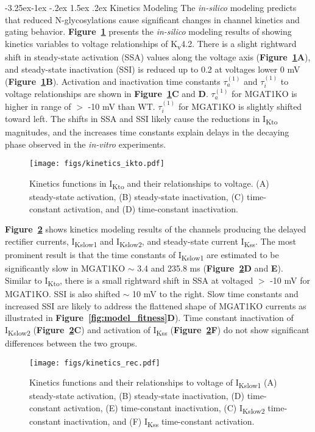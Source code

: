 \documentclass[11pt]{article}
\makeatletter
\renewcommand\subsection{\@startsection{subsection}{2}{\z@}%
                                     {-3.25ex\@plus -1ex \@minus -.2ex}%
                                     {1.5ex \@plus .2ex}%
                                     {\normalfont\fontfamily{phv}\fontsize{14}{17}\bfseries}}
\makeatother
\begin{document}
\subsection{Kinetics Modeling} \label{s:results.kinetics}
The \textit{in-silico} modeling predicts that reduced N-glycosylations cause significant changes in channel kinetics and gating behavior. \textbf{Figure~\ref{fig:kinetics_ikto}} presents the \textit{in-silico} modeling results of showing kinetics variables to voltage relationships of K\textsubscript{v}4.2. There is a slight rightward shift in steady-state activation (SSA) values along the voltage axis (\textbf{Figure~\ref{fig:kinetics_ikto}A}), and steady-state inactivation (SSI) is reduced up to 0.2 at voltages lower 0 mV (\textbf{Figure~\ref{fig:kinetics_ikto}B}). Activation and inactivation time constants $\tau_{a}^{(1)}$ and $\tau_{i}^{(1)}$ to voltage relationships are shown in \textbf{Figure~\ref{fig:kinetics_ikto}C} and \textbf{D}. $\tau_{a}^{(1)}$ for MGAT1KO is higher in range of $>$ -10 mV than WT. $\tau_{i}^{(1)}$ for MGAT1KO is slightly shifted toward left. The shifts in SSA and SSI likely cause the reductions in I\textsubscript{Kto} magnitudes, and the increases time constants explain delays in the decaying phase observed in the \textit{in-vitro} experiments.
\begin{figure}[!ht]
    \centering
    \texttt{[image: figs/kinetics\_ikto.pdf]}
    \caption{Kinetics functions in I\textsubscript{Kto} and their relationships to voltage. (A) steady-state activation, (B) steady-state inactivation, (C) time-constant activation, and (D) time-constant inactivation.}
    \label{fig:kinetics_ikto}
\end{figure}

\textbf{Figure~\ref{fig:kinetics_rec}} shows kinetics modeling results of the channels producing the delayed rectifier currents, I\textsubscript{Kslow1} and I\textsubscript{Kslow2}, and steady-state current I\textsubscript{Kss}. The most prominent result is that the time constants of I\textsubscript{Kslow1} are estimated to be significantly slow in MGAT1KO $\sim$ 3.4 and 235.8 ms (\textbf{Figure~\ref{fig:kinetics_rec}D} and \textbf{E}). Similar to I\textsubscript{Kto}, there is a small rightward shift in SSA at voltaged $>$ -10 mV for MGAT1KO. SSI is also shifted $\sim$ 10 mV to the right. Slow time constants and increased SSI are likely to address the flattened shape of MGAT1KO currents as illustrated in \textbf{Figure~\ref{fig:model_fitness}D}). Time constant inactivation of I\textsubscript{Kslow2} (\textbf{Figure~\ref{fig:kinetics_rec}C}) and activation of I\textsubscript{Kss} (\textbf{Figure~\ref{fig:kinetics_rec}F}) do not show significant differences between the two groups.
\begin{figure}[!ht]
    \centering
    \texttt{[image: figs/kinetics\_rec.pdf]}
    \caption{Kinetics functions and their relationships to voltage of I\textsubscript{Kslow1} (A) steady-state activation, (B) steady-state inactivation, (D) time-constant activation, (E) time-constant inactivation, (C) I\textsubscript{Kslow2} time-constant inactivation, and (F) I\textsubscript{Kss} time-constant activation.}
    \label{fig:kinetics_rec}
\end{figure}
\end{document}
